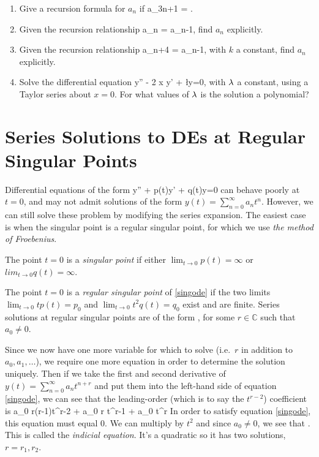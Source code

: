 \documentclass[12pt]{book}
\begin{document}
\begin{enumerate}
  \item
    Give a recursion formula for $a_n$ if
    \bee
    a_{3n+1} = .
    \eee

  \item
    Given the recursion relationship
    \bee
    a_n = a_{n-1},
    \eee
    find $a_n$ explicitly.

  \item
    Given the recursion relationship
    \bee
    a_{n+4} =  a_{n-1},
    \eee
    with $k$ a constant, find $a_n$ explicitly.

  \item Solve the differential equation
    \bee
    y'' - 2 x y' + \l y=0,
    \eee
    with $\lambda$ a constant, using a Taylor series about $x=0$. For what values
    of $\lambda$ is the solution a polynomial?

\end{enumerate}



\chapter{Series Solutions to DEs at Regular Singular Points}
Differential equations of the form
\be
\label{singode}
y'' + p(t)y' + q(t)y=0
\ee
can behave poorly at $t=0$, and may not admit solutions of the form
$y(t) =\sum_{n=0}^\infty a_n t^n$. However, we can still solve these problem
by modifying the series expansion. The easiest case is when the singular
point is a regular singular point, for which we use \emph{the method of
Froebenius}.

The point $t=0$ is a \emph{singular point} if either
$\lim_{t \rightarrow 0}p(t)=\infty$ or  $lim_{t \rightarrow 0}q(t)=\infty$.

The point $t=0$ is a \emph{regular singular point} of \eqref{singode} if
the two limits $\lim_{t\rightarrow 0} t p(t) =p_0$
and $\lim_{t\rightarrow 0} t^2 q(t) =q_0$
exist and are finite. Series solutions at regular singular points are of the
form
\be
{},
\ee
for some $r\in\mathbb{C}$ such that $a_0 \neq 0$.

Since we now have one more variable for which to solve (i.e.\ $r$ in addition
to $a_0, a_1,\dots$), we require one more equation in order to determine the
solution uniquely. Then if we take the first and second derivative of
$y(t) = \sum_{n=0}^\infty a_n t^{n+r}$ and put them into the left-hand side of
equation \eqref{singode}, we can see that the
leading-order (which is to say the $t^{r-2}$) coefficient is
\bee
a_0 r(r-1)t^{r-2} + a_0  r t^{r-1} + a_0  t^r
\eee
In order to satisfy equation \eqref{singode}, this equation must equal $0$.
We can multiply by $t^2$ and since $a_0 \neq 0$, we see that
\be
{}.
\ee
This is called the \emph{indicial equation}. It's a quadratic so it has two
solutions, $r=r_1,r_2$.
\end{document}
